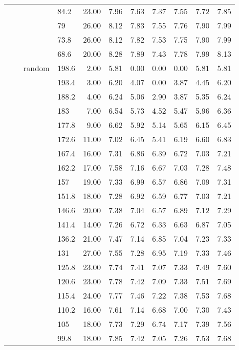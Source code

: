 \begin{longtable}{llllrrrrrrr}
   &  &  & 84.2 & 23.00 & 7.96 & 7.63 & 7.37 & 7.55 & 7.72 & 7.85 \\ 
   &  &  & 79 & 26.00 & 8.12 & 7.83 & 7.55 & 7.76 & 7.90 & 7.99 \\ 
   &  &  & 73.8 & 26.00 & 8.12 & 7.82 & 7.53 & 7.75 & 7.90 & 7.99 \\ 
   &  &  & 68.6 & 20.00 & 8.28 & 7.89 & 7.43 & 7.78 & 7.99 & 8.13 \\ 
   &  & random & 198.6 & 2.00 & 5.81 & 0.00 & 0.00 & 0.00 & 5.81 & 5.81 \\ 
   &  &  & 193.4 & 3.00 & 6.20 & 4.07 & 0.00 & 3.87 & 4.45 & 6.20 \\ 
   &  &  & 188.2 & 4.00 & 6.24 & 5.06 & 2.90 & 3.87 & 5.35 & 6.24 \\ 
   &  &  & 183 & 7.00 & 6.54 & 5.73 & 4.52 & 5.47 & 5.96 & 6.36 \\ 
   &  &  & 177.8 & 9.00 & 6.62 & 5.92 & 5.14 & 5.65 & 6.15 & 6.45 \\ 
   &  &  & 172.6 & 11.00 & 7.02 & 6.45 & 5.41 & 6.19 & 6.60 & 6.83 \\ 
   &  &  & 167.4 & 16.00 & 7.31 & 6.86 & 6.39 & 6.72 & 7.03 & 7.21 \\ 
   &  &  & 162.2 & 17.00 & 7.58 & 7.16 & 6.67 & 7.03 & 7.28 & 7.48 \\ 
   &  &  & 157 & 19.00 & 7.33 & 6.99 & 6.57 & 6.86 & 7.09 & 7.31 \\ 
   &  &  & 151.8 & 18.00 & 7.28 & 6.92 & 6.59 & 6.77 & 7.03 & 7.21 \\ 
   &  &  & 146.6 & 20.00 & 7.38 & 7.04 & 6.57 & 6.89 & 7.12 & 7.29 \\ 
   &  &  & 141.4 & 14.00 & 7.26 & 6.72 & 6.33 & 6.63 & 6.87 & 7.05 \\ 
   &  &  & 136.2 & 21.00 & 7.47 & 7.14 & 6.85 & 7.04 & 7.23 & 7.33 \\ 
   &  &  & 131 & 27.00 & 7.55 & 7.28 & 6.95 & 7.19 & 7.33 & 7.46 \\ 
   &  &  & 125.8 & 23.00 & 7.74 & 7.41 & 7.07 & 7.33 & 7.49 & 7.60 \\ 
   &  &  & 120.6 & 23.00 & 7.78 & 7.42 & 7.09 & 7.33 & 7.51 & 7.69 \\ 
   &  &  & 115.4 & 24.00 & 7.77 & 7.46 & 7.22 & 7.38 & 7.53 & 7.68 \\ 
   &  &  & 110.2 & 16.00 & 7.61 & 7.14 & 6.68 & 7.00 & 7.30 & 7.43 \\ 
   &  &  & 105 & 18.00 & 7.73 & 7.29 & 6.74 & 7.17 & 7.39 & 7.56 \\ 
   &  &  & 99.8 & 18.00 & 7.85 & 7.42 & 7.05 & 7.26 & 7.53 & 7.68 \\ 

\end{longtable}
